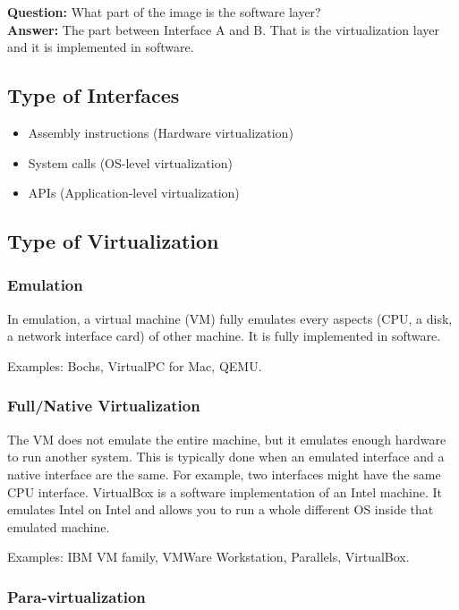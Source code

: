 \documentclass[twoside]{article}
\newcommand{\que}[1]{\textbf{Question:} #1\\}
\newcommand{\ans}[1]{\textbf{Answer:} #1\\}
\begin{document}
\que{What part of the image is the software layer?}
\ans{The part between Interface A and B. That is the virtualization layer and it is implemented in software.}

\subsection{Type of Interfaces}
\begin{itemize}
\item Assembly instructions (Hardware virtualization)
\item System calls (OS-level virtualization)
\item APIs (Application-level virtualization)
\end{itemize}

\subsection{Type of Virtualization}

\subsubsection{Emulation}

In emulation, a virtual machine (VM) fully emulates every aspects (CPU, a disk, a network interface card) of other machine. It is fully implemented in software.

Examples: Bochs, VirtualPC for Mac, QEMU.

\subsubsection{Full/Native Virtualization}

The VM does not emulate the entire machine, but it emulates enough hardware to run another system. This is typically done when an emulated interface and a native interface are the same. For example, two interfaces might have the same CPU interface. VirtualBox is a software implementation of an Intel machine. It emulates Intel on Intel and allows you to run a whole different OS inside that emulated machine.

Examples: IBM VM family, VMWare Workstation, Parallels, VirtualBox.

\subsubsection{Para-virtualization}
\end{document}
